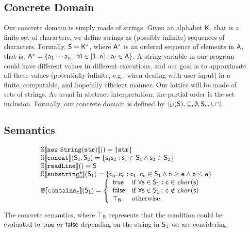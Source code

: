 \documentclass[orivec]{llncs}
\begin{document}
\subsection{Concrete Domain}
Our concrete domain is simply made of strings. Given an alphabet $\mathsf{K}$, that is a finite set of characters, we define strings as (possibly infinite) sequences of characters. Formally, $\mathsf{S}=\mathsf{K}^*$, where $\mathsf{A}^*$ is an ordered sequence of elements in $\mathsf{A}$, that is, $\mathsf{A}^*=\{ \mathsf{a}_1 \cdots \mathsf{a}_n : \forall \mathsf{i} \in [1..\mathsf{n}] : \mathsf{a}_i \in \mathsf{A}\}$. A string variable in our program could have different values in different executions, and our goal is to approximate all these values (potentially infinite, e.g., when dealing with user input) in a finite, computable, and hopefully efficient manner. Our lattice will be made of sets of strings. As usual in abstract interpretation, the partial order is the set inclusion. Formally, our concrete domain is defined by 
$\langle \wp(\mathsf{S}), \subseteq, \emptyset, \mathsf{S}, \cup, \cap \rangle$.

 
 
\subsection{Semantics}
 
\begin{table}[t]
\footnotesize
\[
\begin{array}{l}
\mathbb{S}\llbracket \mathtt{\mathtt{new\ String(str)}} \rrbracket()=\{\mathtt{str}\}\\
\mathbb{S}\llbracket \mathtt{\mathtt{concat}} \rrbracket(\mathsf{S_1}, \mathsf{S_2})=\{\mathsf{s_1}\mathsf{s_2} : \mathsf{s_1} \in \mathsf{S_1} \land \mathsf{s_2} \in \mathsf{S_2}\}\\
\mathbb{S}\llbracket \mathtt{\mathtt{readLine}} \rrbracket()=\mathsf{S}\\
\mathbb{S}\llbracket \mathtt{\mathtt{substring_b^e}} \rrbracket(\mathsf{S_1})=\{\mathsf{c_b}..\mathsf{c_e} : \mathsf{c_1}..\mathsf{c_n} \in \mathsf{S_1} \land \mathsf{n} \geq \mathtt{e} \land \mathtt{b} \leq \mathtt{e}\}\\
\mathbb{B}\llbracket \mathtt{\mathtt{contains_c}} \rrbracket(\mathsf{S_1})=
\left\{
\begin{array}{ll}
\mathsf{true} & \textrm{if } \forall \mathsf{s} \in \mathsf{S_1} : \mathtt{c} \in \mathit{char}(\mathsf{s})\\
\mathsf{false} & \textrm{if } \forall \mathsf{s} \in \mathsf{S_1} : \mathtt{c} \notin \mathit{char}(\mathsf{s})\\
\mathsf{\top_B} & \textrm{otherwise}\\
\end{array}
\right.
\end{array}
\]
\caption{The concrete semantics, where $\mathsf{\top_B}$ represents that the condition could be evaluated to $\mathsf{true}$ or $\mathsf{false}$ depending on the string in $\mathsf{S}_1$ we are considering.}
\label{tab:concretesemantics}
\end{table}
 
\end{document}

